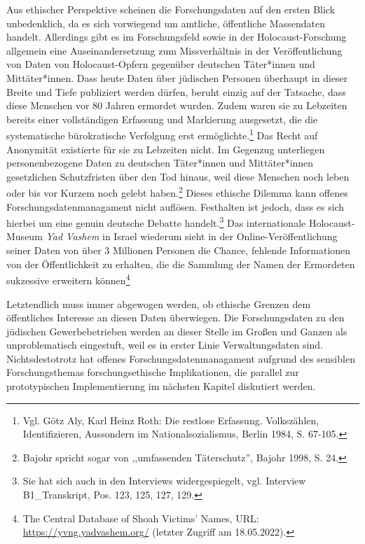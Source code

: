 Aus ethischer Perspektive scheinen die Forschungsdaten auf den ersten Blick unbedenklich, da es sich vorwiegend um amtliche, öffentliche Massendaten handelt. Allerdings gibt es im Forschungsfeld sowie in der Holocaust-Forschung allgemein eine Auseinandersetzung zum Missverhältnis in der Veröffentlichung von Daten von Holocaust-Opfern gegenüber deutschen Täter*innen und Mittäter*innen. Dass heute Daten über jüdischen Personen überhaupt in dieser Breite und Tiefe publiziert werden dürfen, beruht einzig auf der Tatsache, dass diese Menschen vor 80 Jahren ermordet wurden. Zudem waren sie zu Lebzeiten bereits einer vollständigen Erfassung und Markierung ausgesetzt, die die systematische bürokratische Verfolgung erst ermöglichte.\footnote{Vgl. Götz Aly, Karl Heinz Roth: Die restlose Erfassung. Volkszählen, Identifizieren, Aussondern im Nationalsozialismus, Berlin 1984, S. 67-105.} Das Recht auf Anonymität existierte für sie zu Lebzeiten nicht. Im Gegenzug unterliegen personenbezogene Daten zu deutschen Täter*innen und Mittäter*innen gesetzlichen Schutzfristen über den Tod hinaus, weil diese Menschen noch leben oder bis vor Kurzem noch gelebt haben.\footnote{Bajohr spricht sogar von ,,umfassenden Täterschutz'', Bajohr 1998, S. 24.} Dieses ethische Dilemma kann offenes Forschungsdatenmanagament nicht auflösen. Festhalten ist jedoch, dass es sich hierbei um eine genuin deutsche Debatte handelt.\footnote{Sie hat sich auch in den Interviews widergespiegelt, vgl. Interview B1\_Transkript, Pos. 123, 125, 127, 129.} Das internationale Holocaust-Museum \textit{Yad Vashem} in Israel wiederum sieht in der Online-Veröffentlichung seiner Daten von über 3 Millionen Personen die Chance, fehlende Informationen von der Öffentlichkeit zu erhalten, die die Sammlung der Namen der Ermordeten sukzessive erweitern können\footnote{The Central Database of Shoah Victims' Names, URL: \url{https://yvng.yadvashem.org/} (letzter Zugriff am 18.05.2022).}

Letztendlich muss immer abgewogen werden, ob ethische Grenzen dem öffentliches Interesse an diesen Daten überwiegen. Die Forschungsdaten zu den jüdischen Gewerbebetrieben werden an dieser Stelle im Großen und Ganzen als unproblematisch eingestuft, weil es in erster Linie Verwaltungsdaten sind. Nichtsdestotrotz hat offenes Forschungsdatenmanagament aufgrund des sensiblen Forschungsthemas forschungsethische Implikationen, die parallel zur prototypischen Implementierung im nächsten Kapitel diskutiert werden.




